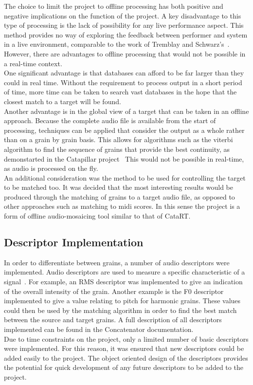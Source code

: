 \documentclass{scrartcl}
\begin{document}
    The choice to limit the project to offline processing has both positive and
    negative implications on the function of the project. A key disadvantage to
    this type of processing is the lack of possibility for any live performance
    aspect. This method provides no way of exploring the feedback between
    performer and system in a live environment, comparable to the work of
    Tremblay and Schwarz's~\citeyearpar{Tremblay2010}.
    However, there are advantages to offline processing that would not be
    possible in a real-time context.\\
    One significant advantage is that databases can afford to be far larger
    than they could in real time. Without the requirement to process output in
    a short period of time, more time can be taken to search vast databases in
    the hope that the closest match to a target will be found.\\
    Another advantage is in the global view of a target that can be taken in an
    offline approach. Because the complete audio file is available from the
    start of processing, techniques can be applied that consider the output as
    a whole rather than on a grain by grain basis. This allows for algorithms
    such as the viterbi algorithm to find the sequence of grains that provide
    the best continuity, as demonstarted in the Catapillar
    project~\parencite[p.4]{Schwarz2003} This would not be possible in
    real-time, as audio is processed on the fly.\\

    An additional consideration was the method to be used for controlling the
    target to be matched too. It was decided that the most interesting results
    would be produced through the matching of grains to a target audio file, as
    opposed to other approaches such as matching to midi scores. In this sense
    the project is a form of offline audio-mosaicing tool similar to that of
    CataRT.
    
    \subsection*{Descriptor Implementation}
    In order to differentiate between grains, a number of audio descriptors
    were implemented. Audio descriptors are used to measure a specific
    characteristic of a signal~\parencite[p.31]{Lerch2012}. For example, an RMS
    descriptor was implemented to give an indication of the overall intensity
    of the grain. Another example is the F0 descriptor implemented to give a
    value relating to pitch for harmonic grains. These values could then be
    used by the matching algorithm in order to find the best match between the
    source and target grains. A full description of all descriptors implemented
    can be found in the Concatenator documentation.\\
    Due to time constraints on the project, only a limited number of basic
    descriptors were implemented. For this reason, it was ensured that new
    descriptors could be added easily to the project. The object oriented
    design of the descriptors provides the potential for quick development of
    any future descriptors to be added to the project. 
\end{document}
